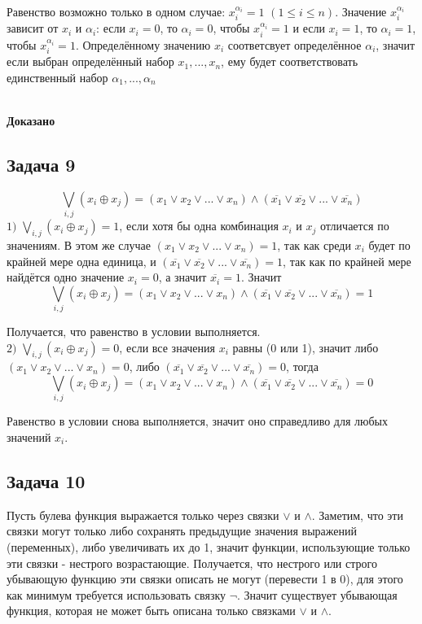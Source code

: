 \documentclass[a4paper,14pt]{article} %
\begin{document}
Равенство возможно только в одном случае: $x_i^{\alpha_i}=1$ $(1\leqslant i\leqslant n)$. Значение $x_i^{\alpha_i}$ зависит от $x_i$ и $\alpha_i$: если $x_i=0$, то $\alpha_i=0$, чтобы $x_i^{\alpha_i}=1$ и если $x_i=1$, то $\alpha_i=1$, чтобы $x_i^{\alpha_i}=1$. Определённому значению $x_i$ соответсвует определённое $\alpha_i$, значит если выбран определённый набор $x_1,...,x_n$, ему будет соответствовать единственный набор $\alpha_1,...,\alpha_n$ \\\\
\begin{flushright}
\begin{large}
\textbf {Доказано}
\end{large}
\end{flushright}

\begin{center}
\subsection{Задача 9}
\end{center}
\[\bigvee \limits_{i, j} (x_i\oplus x_j)=(x_1\vee x_2 \vee ... \vee x_n)\wedge (\overline{x_1} \vee \overline{x_2} \vee ... \vee \overline{x_n}) \]
$1)$ $\bigvee \limits_{i, j} (x_i\oplus x_j)=1$, если хотя бы одна комбинация $x_i$ и $x_j$ отличается по значениям. В этом же случае $(x_1\vee x_2 \vee ... \vee x_n)=1$, так как среди $x_i$ будет по крайней мере одна единица, и $(\overline{x_1} \vee \overline{x_2} \vee ... \vee \overline{x_n})= 1$, так как по крайней мере найдётся одно значение $x_i=0$, а значит $\overline{x_i}=1$. Значит
\[\bigvee \limits_{i, j} (x_i\oplus x_j)=(x_1\vee x_2 \vee ... \vee x_n)\wedge (\overline{x_1} \vee \overline{x_2} \vee ... \vee \overline{x_n})=1 \]

Получается, что равенство в условии выполняется.\\
$2)$ $\bigvee \limits_{i, j} (x_i\oplus x_j)=0$, если все значения $x_i$ равны (0 или 1), значит либо $(x_1\vee x_2 \vee ... \vee x_n)=0$, либо $(\overline{x_1} \vee \overline{x_2} \vee ... \vee \overline{x_n})= 0$, тогда
\[\bigvee \limits_{i, j} (x_i\oplus x_j)=(x_1\vee x_2 \vee ... \vee x_n)\wedge (\overline{x_1} \vee \overline{x_2} \vee ... \vee \overline{x_n})=0 \]

Равенство в условии снова выполняется, значит оно справедливо для любых значений $x_i$.

\newpage
\begin{center}
\subsection{Задача 10}
\end{center}
\par
Пусть булева функция выражается только через связки $\vee$ и $\wedge$. Заметим, что эти связки могут только либо сохранять предыдущие значения выражений (переменных), либо увеличивать их до 1, значит функции, использующие только эти связки - нестрого возрастающие. Получается, что нестрого или строго убывающую функцию эти связки описать не могут (перевести 1 в 0), для этого как минимум требуется использовать связку $\neg$.
Значит существует убывающая функция, которая не может быть описана только связками $\vee$ и $\wedge$.
\end{document}
